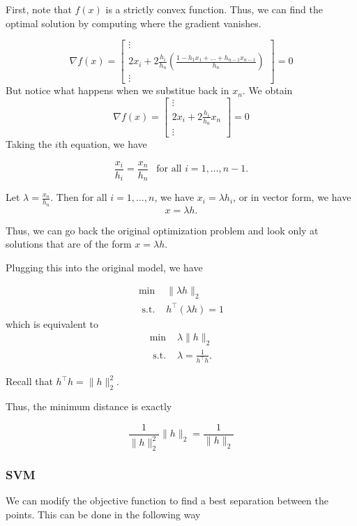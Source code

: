 First, note that $f(x)$ is a strictly convex function.   Thus, we can find the optimal solution by computing where the gradient vanishes.

$$
\nabla f(x) = \begin{bmatrix}
\vdots \\
2x_i + 2\frac{h_i}{h_n}\left( \frac{1 - h_1 x_1 + \dots + h_{n-1}x_{n-1}}{h_n}\right)\\
\vdots
\end{bmatrix} = 0
$$
But notice what happens when we substitue back in $x_n$.  We obtain
$$
\nabla f(x) = \begin{bmatrix}
\vdots \\
2x_i + 2\frac{h_i}{h_n}x_n\\
\vdots
\end{bmatrix} = 0
$$
Taking the $i$th equation, we have

$$
\frac{x_i}{h_i} = \frac{x_n}{h_n} \ \ \text{ for all } i=1, \dots, n-1.
$$

Let $\lambda = \frac{x_n}{h_n}$.  Then for all $i=1, \dots, n$, we have $x_i = \lambda h_i$, or in vector form, we have
$$
x = \lambda h.
$$

Thus, we can go back the original optimization problem and look only at solutions that are of the form $x = \lambda h$.

Plugging this into the original model, we have

\begin{align*}
\min &  \|\lambda h \|_2 \\
 \text{ s.t. } & h^\top (\lambda h)= 1
\end{align*}
which is equivalent to
\begin{align*}
\min &   \lambda \|h\|_2\\
 \text{ s.t. } & \lambda = \frac{1}{h^\top  h}.
\end{align*}

Recall that $h^\top h = \|h\|_2^2$.

Thus, the minimum distance is exactly 

$$
\frac{1}{\|h\|_2^2} \|h\|_2 = \frac{1}{\|h\|_2}
$$

\subsubsection{SVM}
We can modify the objective function to find a best separation between the points.  This can be done in the following way


\begin{center}
\end{center}



